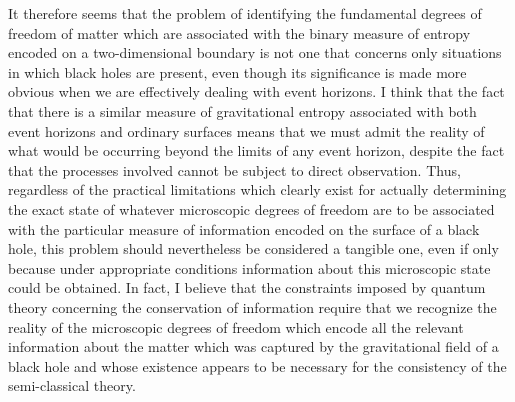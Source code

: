 \documentclass[notitlepage,12pt]{report}
\begin{document}
It therefore seems that the problem of identifying the fundamental degrees of freedom of matter which are associated with the binary measure of entropy encoded on a two-dimensional boundary is not one that concerns only situations in which black holes are present, even though its significance is made more obvious when we are effectively dealing with event horizons. I think that the fact that there is a similar measure of gravitational entropy associated with both event horizons and ordinary surfaces means that we must admit the reality of what would be occurring beyond the limits of any event horizon, despite the fact that the processes involved cannot be subject to direct observation. Thus, regardless of the practical limitations which clearly exist for actually determining the exact state of whatever microscopic degrees of freedom are to be associated with the particular measure of information encoded on the surface of a black hole, this problem should nevertheless be considered a tangible one, even if only because under appropriate conditions information about this microscopic state could be obtained. In fact, I believe that the constraints imposed by quantum theory concerning the conservation of information require that we recognize the reality of the microscopic degrees of freedom which encode all the relevant information about the matter which was captured by the gravitational field of a black hole and whose existence appears to be necessary for the consistency of the semi-classical theory.
\end{document}
